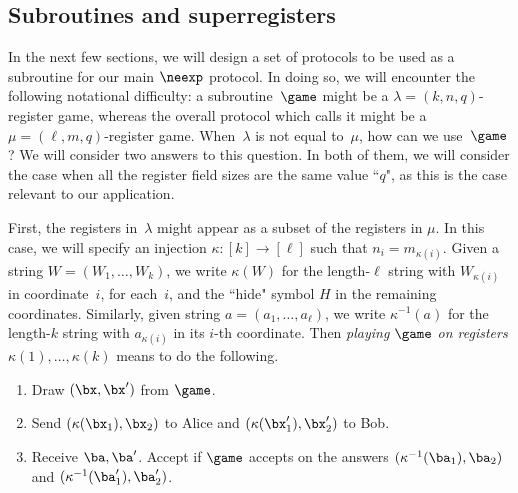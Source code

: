 \subsection{Subroutines and superregisters}

In the next few sections, we will design a set of protocols
to be used as a subroutine for our main $\neexp$ protocol.
In doing so, we will encounter the following notational difficulty:
a subroutine~$\game$ might be a $\lambda = (k, n, q)$-register game,
whereas the overall protocol which calls it might be a $\mu = (\ell, m, q)$-register game.
When~$\lambda$ is not equal to~$\mu$, how can we use~$\game$?
We will consider two answers to this question.
In both of them, we will consider the case when all the register field sizes are the same value ``$q$",
as this is the case relevant to our application.

\begin{notation}
First, the registers in~$\lambda$ might appear as a subset of the registers in $\mu$.
In this case, we will specify an injection $\kappa : [k] \rightarrow [\ell]$
such that $n_i = m_{\kappa(i)}$.
Given a string $W = (W_1, \ldots, W_k)$, we write $\kappa(W)$
for the length-$\ell$ string with $W_{\kappa(i)}$ in coordinate~$i$, for each~$i$,
and the ``hide" symbol $H$ in the remaining coordinates.
Similarly, given string $a = (a_1, \ldots, a_\ell)$,
we write $\kappa^{-1}(a)$ for the length-$k$ string with $a_{\kappa(i)}$ in its $i$-th coordinate.
Then \emph{playing $\game$ on registers $\kappa(1), \ldots, \kappa(k)$} means to do the following.
\begin{enumerate}
\item Draw $(\bx, \bx')$ from $\game$.
\item Send $(\kappa(\bx_1), \bx_2)$ to Alice and $(\kappa(\bx_1'), \bx_2')$ to Bob.
\item Receive $\ba, \ba'$. Accept if $\game$ accepts on the answers $(\kappa^{-1}(\ba_1), \ba_2)$ and $(\kappa^{-1}(\ba_1'), \ba_2')$.
\end{enumerate}
\end{notation}

